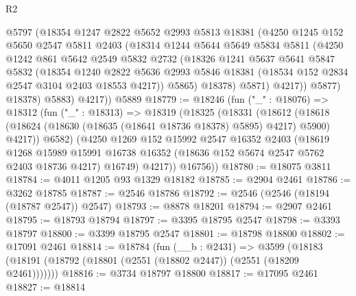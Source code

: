 \begin{lexlean}{R2}
\begin{coremodule}
              @5797
              (@18354
                @1247
                @2822
                @5652
                @2993
                @5813
                @18381
                (@4250
                  @1245
                  @152
                  @5650
                  @2547
                  @5811
                  @2403
                  (@18314
                    @1244
                    @5644
                    @5649
                    @5834
                    @5811
                    (@4250
                      @1242
                      @861
                      @5642
                      @2549
                      @5832
                      @2732
                      (@18326
                        @1241
                        @5637
                        @5641
                        @5847
                        @5832
                        (@18354
                          @1240
                          @2822
                          @5636
                          @2993
                          @5846
                          @18381
                          (@18534 @152 @2834 @2547 @3104 @2403 @18553 @4217))
                        @5865)
                      @18378)
                    @5871)
                  @4217))
              @5877)
            @18378)
          @5883)
        @4217))
    @5889
@18779 := @18246
    (fun ("_" : @18076) =>
    @18312
      (fun ("_" : @18313) =>
      @18319
        (@18325
          (@18331
            (@18612
              (@18618 (@18624 (@18630 (@18635 (@18641 @18736 @18378) @5895) @4217) @5900) @4217))
            @6582)
          (@4250
            @1269
            @152
            @15992
            @2547
            @16352
            @2403
            (@18619
              @1268
              @15989
              @15991
              @16738
              @16352
              (@18636 @152 @5674 @2547 @5762 @2403 @18736 @4217)
              @16749)
            @4217))
        @16756))
@18780 := @18075 @3811
@18784 := @4011 @1205 @93 @1329 @18182
@18785 := @2904 @2461
@18786 := @3262 @18785
@18787 := @2546 @18786
@18792 := @2546 (@2546 (@18194 (@18787 @2547)) @2547)
@18793 := @8878 @18201
@18794 := @2907 @2461
@18795 := @18793 @18794
@18797 := @3395 @18795 @2547
@18798 := @3393 @18797
@18800 := @3399 @18795 @2547
@18801 := @18798 @18800
@18802 := @17091 @2461
@18814 := @18784
    (fun (__b : @2431) =>
    @3599 (@18183 (@18191 (@18792 (@18801 (@2551 (@18802 @2447)) (@2551 (@18209 @2461)))))))
@18816 := @3734 @18797 @18800
@18817 := @17095 @2461
@18827 := @18814

\end{coremodule}
\end{lexlean}
